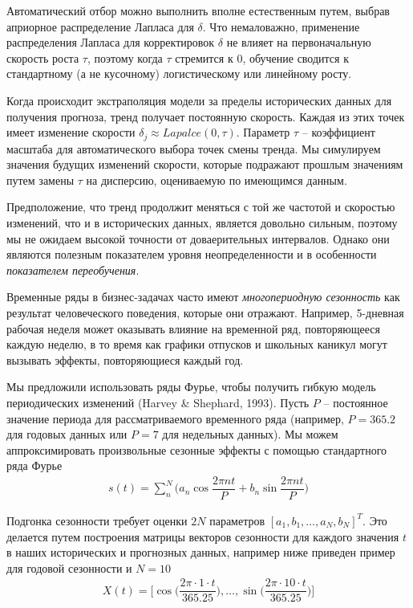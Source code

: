\documentclass[%
	11pt,
	a4paper,
	utf8,
		]{article}
\begin{document}
Автоматический отбор можно выполнить вполне естественным путем, выбрав априорное распределение Лапласа для $\delta$. Что немаловажно, применение распределения Лапласа для корректировок $\delta$ не влияет на первоначальную скорость роста $\tau$, поэтому когда $\tau$ стремится к 0, обучение сводится к стандартному (а не кусочному) логистическому или линейному росту.

Когда происходит экстраполяция модели за пределы исторических данных для получения прогноза, тренд получает постоянную скорость. Каждая из этих точек имеет изменение скорости $\delta_j \approx Lapalce(0, \tau)$. Параметр $\tau$ -- коэффициент масштаба для автоматического выбора точек смены тренда. Мы симулируем значения будущих изменений скорости, которые подражают прошлым значениям путем замены $\tau$ на дисперсию, оцениваемую по имеющимся данным.

Предположение, что тренд продолжит меняться с той же частотой и скоростью изменений, что и в исторических данных, является довольно сильным, поэтому мы не ожидаем высокой точности от доваерительных интервалов. Однако они являются полезным показателем уровня неопределенности и в особенности \emph{показателем переобучения}.

Временные ряды в бизнес-задачах часто имеют \emph{многопериодную сезонность} как результат человеческого поведения, которые они отражают. Например, 5-дневная рабочая неделя может оказывать влияние на временной ряд, повторяющееся каждую неделю, в то время как графики отпусков и школьных каникул могут вызывать эффекты, повторяющиеся каждый год.

Мы предложили использовать ряды Фурье, чтобы получить гибкую модель  периодических изменений (Harvey \& Shephard, 1993). Пусть $P$ -- постоянное значение периода для рассматриваемого временного ряда (например, $P = 365.2$ для годовых данных или $P = 7$ для недельных данных). Мы можем аппроксимировать произвольные сезонные эффекты с помощью стандартного ряда Фурье
\begin{align*}
s(t) = \sum_{n}^{N} \Bigg( a_n \cos \dfrac{2 \pi n t}{P} + b_n \sin \dfrac{2 \pi n t}{P} \Bigg)
\end{align*} 

Подгонка сезонности требует оценки $2 N$ параметров $[a_1, b_1, \ldots, a_N, b_N]^T$. Это делается путем построения матрицы векторов сезонности для каждого значения $t$ в наших исторических и прогнозных данных, например ниже приведен пример для годовой сезонности и $N = 10$
\begin{align*}
	X(t) = \Bigg[ \cos \Big( \dfrac{2\pi \cdot 1 \cdot t}{365.25} \Big), \ldots, \sin \Big( \dfrac{2\pi \cdot 10 \cdot t}{365.25} \Big) \Bigg]
\end{align*}
\end{document}
